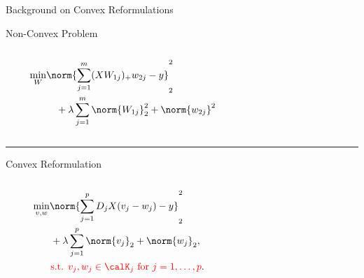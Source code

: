 \documentclass[usenames,dvipsnames,mathserif,notheorems]{beamer}
\newcommand{\centerrule}{
	{
	\vspace{-0.5em}
	\center \rule{\textwidth}{0.1em}
	\vspace{-0.2em}
	}
}
\begin{document}
\begin{frame}{Background on Convex Reformulations}

	\vspace{0.2em}
	{\large Non-Convex Problem}
	\vspace{-1em}
	\begin{columns}
		\centering
		\begin{column}{0.2\linewidth}
			\small
			\[
				\begin{aligned}
					\min_{W} & \norm{\sum_{j=1}^m (X W_{1j})_+ w_{2j} - y}_2^2                  \\
					         & \quad + \lambda \sum_{j=1}^m \norm{W_{1j}}_2^2 + \norm{w_{2j}}^2
				\end{aligned}
			\]
		\end{column}

		\begin{column}{0.7\linewidth}
			\begin{figure}[t]
				\raggedleft
				
			\end{figure}
		\end{column}
	\end{columns}

	\centerrule

	{\large Convex Reformulation} \citep{pilanci2020convex}
	\vspace{-2em}
	\begin{columns}
		\begin{column}{0.2\linewidth}
			\vspace{1.5em}
			\small
			\[
				\begin{aligned}
					\min_{v, w} & \norm{\sum_{j=1}^p D_j X (v_j - w_j) - y}_2^2                       \\
					            & \hspace{0.1em } + \lambda \sum_{j=1}^p \norm{v_j}_2 + \norm{w_j}_2, \\
					            & \hspace{0.1em}
					\textcolor{red}{\text{s.t. }
						v_j, w_j \in \calK_j \text{ for } j = 1,\ldots,p
					}.
				\end{aligned}
			\]
		\end{column}
		\begin{column}{0.7\linewidth}
			\vspace{-1.5em}
			\begin{figure}[t]
				\raggedleft
				
			\end{figure}
		\end{column}
	\end{columns}
\end{frame}
\end{document}
